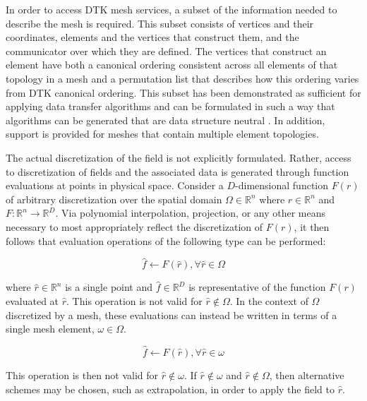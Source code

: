 \documentclass{mc2013}
\begin{document}
In order to access DTK mesh services, a subset of the information
needed to describe the mesh is required. This subset consists of
vertices and their coordinates, elements and the vertices that
construct them, and the communicator over which they are defined. The
vertices that construct an element have both a canonical ordering
consistent across all elements of that topology in a mesh and a
permutation list that describes how this ordering varies from DTK
canonical ordering. This subset has been demonstrated as sufficient
for applying data transfer algorithms \cite{Stewart_2004} and can be
formulated in such a way that algorithms can be generated that are
data structure neutral \cite{Chand_2008}. In addition, support is
provided for meshes that contain multiple element topologies.

The actual discretization of the field is not explicitly
formulated. Rather, access to discretization of fields and the
associated data is generated through function evaluations at points in
physical space. Consider a $D$-dimensional function $F(r)$ of
arbitrary discretization over the spatial domain $\Omega \in
\mathbb{R}^n$ where $r \in \mathbb{R}^n$ and $F : \mathbb{R}^n
\rightarrow \mathbb{R}^D$. Via polynomial interpolation, projection,
or any other means necessary to most appropriately reflect the
discretization of $F(r)$, it then follows that evaluation operations
of the following type can be performed:

\begin{equation}
  \hat{f} \leftarrow F(\hat{r}), \forall \hat{r} \in \Omega
  \label{eq:evaluation}
\end{equation}

where $\hat{r} \in \mathbb{R}^n$ is a single point and $\hat{f} \in
\mathbb{R}^D$ is representative of the function $F(r)$ evaluated at
$\hat{r}$. This operation is not valid for $\hat{r} \notin \Omega$. In
the context of $\Omega$ discretized by a mesh, these evaluations can
instead be written in terms of a single mesh element, $\omega \in
\Omega$.

\begin{equation}
  \hat{f} \leftarrow F(\hat{r}), \forall \hat{r} \in \omega
  \label{eq:element_evaluation}
\end{equation}

This operation is then not valid for $\hat{r} \notin \omega$. If
$\hat{r} \notin \omega$ and $\hat{r} \notin \Omega$, then alternative
schemes may be chosen, such as extrapolation, in order to apply the
field to $\hat{r}$.
\end{document}
